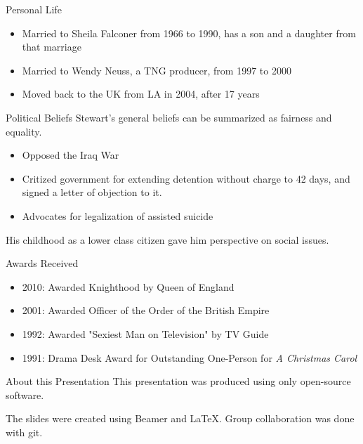 \documentclass[xcolor=dvipsnames]{beamer}
\begin{document}
\begin{frame}{Personal Life}
  \begin{itemize}
    \item Married to Sheila Falconer from 1966 to 1990, has a son and a daughter
    from that marriage
    \item Married to Wendy Neuss, a TNG producer, from 1997 to 2000
    \item Moved back to the UK from LA in 2004, after 17 years
    \begin{qct}
    \end{qct}
  \end{itemize}
\end{frame}

\begin{frame}{Political Beliefs}
  Stewart's general beliefs can be summarized as fairness and equality.  
  \begin{itemize}
    \item Opposed the Iraq War
    \item Critized government for extending detention without charge to 42
    days, and signed a letter of objection to it.
    \item Advocates for legalization of assisted suicide
  \end{itemize}
  His childhood as a lower class citizen gave him perspective on social issues.
\end{frame}

\begin{frame}{Awards Received}
  \begin{itemize}
    \item 2010: Awarded Knighthood by Queen of England
    \item 2001: Awarded Officer of the Order of the British Empire
      \begin{qct}
      \end{qct}
    \item 1992: Awarded "Sexiest Man on Television" by TV Guide
    \item 1991: Drama Desk Award for Outstanding One-Person for \emph{A
    Christmas Carol}
  \end{itemize}
\end{frame}

\begin{frame}{About this Presentation}
  This presentation was produced using only open-source software.

  The slides were created using Beamer and LaTeX.
  Group collaboration was done with git.
\end{frame}
\end{document}
